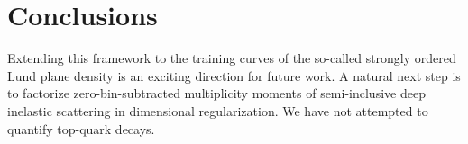 \section{Conclusions}\label{sec:conclusions}

Extending this framework to the training curves of the so-called
strongly ordered Lund plane density is an exciting direction for future
work. A natural next step is to factorize zero-bin-subtracted
multiplicity moments of semi-inclusive deep inelastic scattering in
dimensional regularization. We have not attempted to quantify top-quark
decays.

